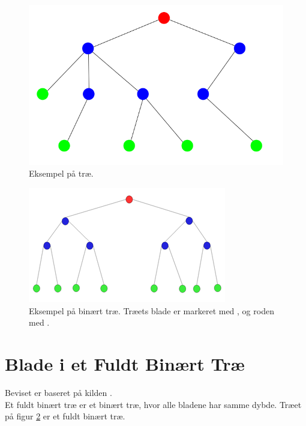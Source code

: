 \begin{figure}
	\begin{center}
		\includegraphics[scale=0.35]{../img/tree.png}
	\end{center}
	\caption{Eksempel på træ.}
	\label{fig:Eksempel på træ.}
\end{figure}



\begin{figure}
	\begin{center}
		\includegraphics[scale=1]{../img/binary_tree.png}
	\end{center}
	\caption{Eksempel på binært træ. Træets blade er markeret med , og roden med . \cite{binaert-trae}}
	\label{fig:Eksempel på binært træ}
\end{figure} 


\section{Blade i et Fuldt Binært Træ}
\label{sec:Blade i et Fuldt Binært Træ}

Beviset er baseret på kilden \cite{tree-leaves}.\\

Et fuldt binært træ er et binært træ, hvor alle bladene har samme dybde. Træet på figur \ref{fig:Eksempel på binært træ} er et fuldt binært træ. \\

